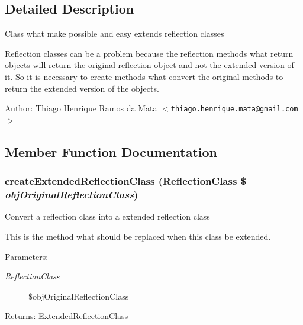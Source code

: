 \subsection{Detailed Description}
Class what make possible and easy extends reflection classes

Reflection classes can be a problem because the reflection methods what return objects will return the original reflection object and not the extended version of it. So it is necessary to create methods what convert the original methods to return the extended version of the objects.

\begin{Desc}
\item[Author:]Thiago Henrique Ramos da Mata $<$\href{mailto:thiago.henrique.mata@gmail.com}{\tt thiago.henrique.mata@gmail.com}$>$ \end{Desc}


\subsection{Member Function Documentation}
\hypertarget{class_extended_reflection_class_6b56ec198bc6a5b5a72076e4e7c19e29}{
\subsubsection[{createExtendedReflectionClass}]{\setlength{\rightskip}{0pt plus 5cm}createExtendedReflectionClass (ReflectionClass \$ {\em objOriginalReflectionClass})}}
\label{class_extended_reflection_class_6b56ec198bc6a5b5a72076e4e7c19e29}


Convert a reflection class into a extended reflection class

This is the method what should be replaced when this class be extended.

\begin{Desc}
\item[Parameters:]
\begin{description}
\item[{\em ReflectionClass}]\$objOriginalReflectionClass \end{description}
\end{Desc}
\begin{Desc}
\item[Returns:]\hyperlink{class_extended_reflection_class}{ExtendedReflectionClass} \end{Desc}


